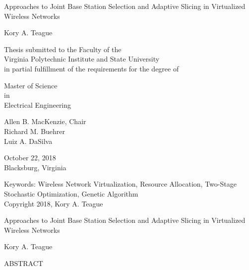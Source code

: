 \documentclass[12pt,dvipsnames]{report}
\begin{document}
\thispagestyle{empty}
\begin{center}

{\Large Approaches to Joint Base Station Selection and Adaptive Slicing in Virtualized Wireless Networks}

\vfill

Kory A. Teague

\vfill

Thesis submitted to the Faculty of the \\
Virginia Polytechnic Institute and State University \\
in partial fulfillment of the requirements for the degree of

\vfill

Master of Science \\
in \\
Electrical Engineering

\vfill

Allen B. MacKenzie, Chair \\
Richard M. Buehrer \\
Luiz A. DaSilva

\vfill

October 22, 2018\\
Blacksburg, Virginia

\vfill

Keywords: Wireless Network Virtualization, Resource Allocation, Two-Stage Stochastic Optimization, Genetic Algorithm \\
Copyright 2018, Kory A. Teague

\end{center}

\pagebreak

\thispagestyle{empty}
\begin{center}

{\large Approaches to Joint Base Station Selection and Adaptive Slicing in Virtualized Wireless Networks}

Kory A. Teague

ABSTRACT

\end{center}
\end{document}
